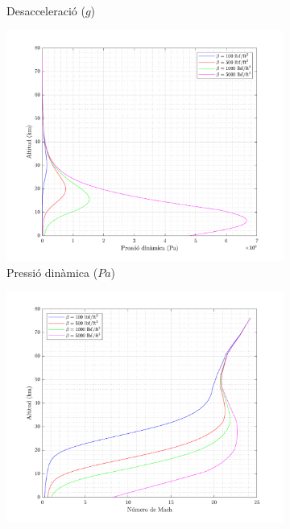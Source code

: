 \begin{figure}[ht]
\begin{subfigure}[t]{.33\textwidth}
        \captionsetup{skip=0pt}
        \caption{Desacceleració ($g$)}
    \end{subfigure}%
    \begin{subfigure}[t]{.33\textwidth}
        \centering
        \includegraphics[width=\linewidth]{imagenes/01_ballistic_graficas/pressio_dinamica_no_title.pdf}
        \captionsetup{skip=0pt}
        \caption{Pressió dinàmica ($Pa$)}
    \end{subfigure}
        \begin{subfigure}[t]{.33\textwidth}
        \centering
        \includegraphics[width=\linewidth]{imagenes/01_ballistic_graficas/mach_no_title.pdf}

\end{subfigure}
\end{figure}
